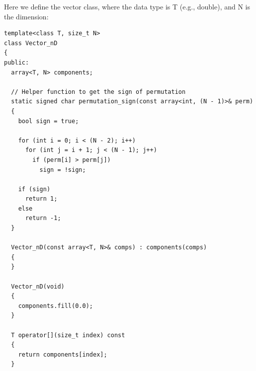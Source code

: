 \documentclass[12pt]{article}
\begin{document}
Here we define the vector class, where the data type is T (e.g., double), and N is the dimension:
\begin{lstlisting}
template<class T, size_t N>
class Vector_nD
{
public:
  array<T, N> components;

  // Helper function to get the sign of permutation
  static signed char permutation_sign(const array<int, (N - 1)>& perm)
  {
    bool sign = true;

    for (int i = 0; i < (N - 2); i++)
      for (int j = i + 1; j < (N - 1); j++)
        if (perm[i] > perm[j])
          sign = !sign;

    if (sign)
      return 1;
    else
      return -1;
  }

  Vector_nD(const array<T, N>& comps) : components(comps)
  {
  }

  Vector_nD(void)
  {
    components.fill(0.0);
  }

  T operator[](size_t index) const
  {
    return components[index];
  }

\end{lstlisting}
\end{document}
